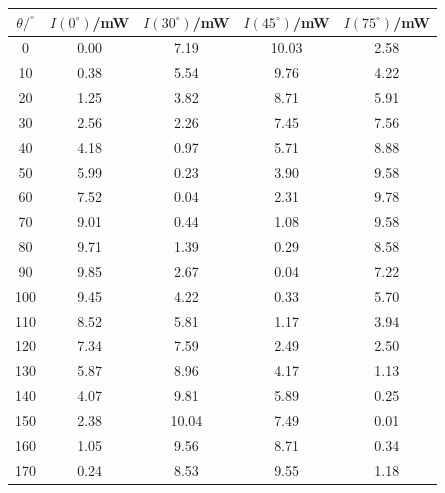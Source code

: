 \begin{tabular}{ccccc}
  \toprule
  $\theta/^{\circ}$ & $I(0^{\circ})$/mW & $I(30^{\circ})$/mW & $I(45^{\circ})$/mW & $I(75^{\circ})$/mW \\
  \midrule
  0 & 0.00 & 7.19 & 10.03 & 2.58 \\
  10 & 0.38 & 5.54 & 9.76 & 4.22 \\
  20 & 1.25 & 3.82 & 8.71 & 5.91 \\
  30 & 2.56 & 2.26 & 7.45 & 7.56 \\
  40 & 4.18 & 0.97 & 5.71 & 8.88 \\
  50 & 5.99 & 0.23 & 3.90 & 9.58 \\
  60 & 7.52 & 0.04 & 2.31 & 9.78 \\
  70 & 9.01 & 0.44 & 1.08 & 9.58 \\
  80 & 9.71 & 1.39 & 0.29 & 8.58 \\
  90 & 9.85 & 2.67 & 0.04 & 7.22 \\
  100 & 9.45 & 4.22 & 0.33 & 5.70 \\
  110 & 8.52 & 5.81 & 1.17 & 3.94 \\
  120 & 7.34 & 7.59 & 2.49 & 2.50 \\
  130 & 5.87 & 8.96 & 4.17 & 1.13 \\
  140 & 4.07 & 9.81 & 5.89 & 0.25 \\
  150 & 2.38 & 10.04 & 7.49 & 0.01 \\
  160 & 1.05 & 9.56 & 8.71 & 0.34 \\
  170 & 0.24 & 8.53 & 9.55 & 1.18 \\
  \bottomrule
\end{tabular}